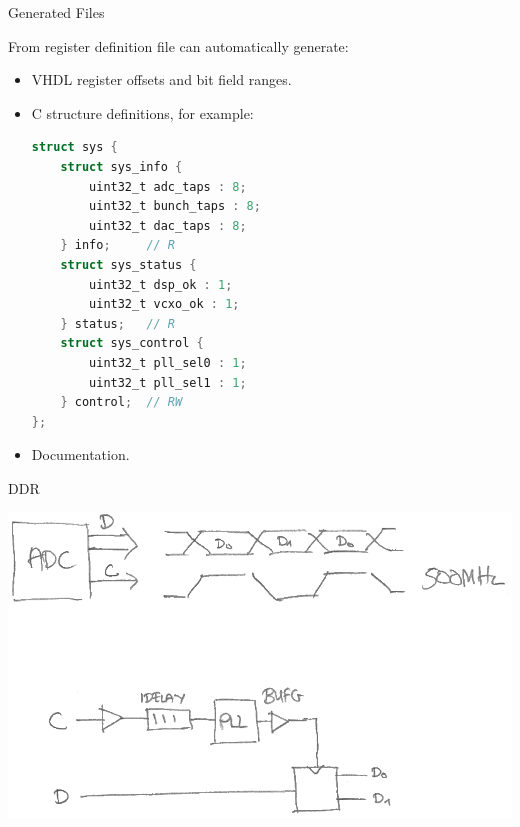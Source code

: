 \documentclass[xcolor=table]{beamer}
\begin{document}
%
\begin{frame}[fragile]{Generated Files}

From register definition file can automatically generate:

\begin{itemize}
\item
    VHDL register offsets and bit field ranges.
\item
    C structure definitions, for example:
\begin{lstlisting}[language=C]
struct sys {
    struct sys_info {
        uint32_t adc_taps : 8;
        uint32_t bunch_taps : 8;
        uint32_t dac_taps : 8;
    } info;     // R
    struct sys_status {
        uint32_t dsp_ok : 1;
        uint32_t vcxo_ok : 1;
    } status;   // R
    struct sys_control {
        uint32_t pll_sel0 : 1;
        uint32_t pll_sel1 : 1;
    } control;  // RW
};
\end{lstlisting}
\item
    Documentation.
\end{itemize}
\end{frame}


%
\begin{frame}{DDR}

\includegraphics[width=\linewidth]{ddr.png}

\end{frame}
\end{document}
